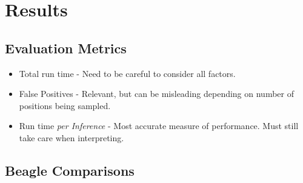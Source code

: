 \documentclass[10pt,xcolor={dvipsnames}]{beamer}
\begin{document}
\begin{NoHyper}
\begin{frame}
\end{frame}


\section{Results}

\subsection{Evaluation Metrics}
\begin{frame}
  \begin{itemize}
  \frametitle{Metrics for Analysing Indexing Performance}
  \item<1-> Total run time - Need to be careful to consider all factors.
  \item<2-> False Positives - Relevant, but can be misleading depending on
  number of positions being sampled.
  \item<3-> Run time \emph{per Inference} - Most accurate measure of performance.
  Must still take care when interpreting.
  \end{itemize}
\end{frame}


\subsection{Beagle Comparisons}


\end{NoHyper}
\end{document}
